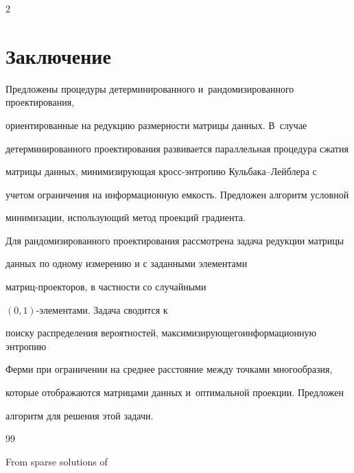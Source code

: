 \begin{multicols}{2}
\section{Заключение}





Предложены процедуры детерминированного и~рандомизированного проектирования, 


ориентированные на редукцию размерности матрицы данных. В~случае 


детерминированного проектирова\-ния развивается параллельная процедура сжатия 


матрицы данных, минимизирующая кросс-энт\-ро\-пию Куль\-ба\-ка--Лейб\-ле\-ра с 


учетом ограничения на информационную емкость.  Предложен алгоритм условной 


минимизации, использующий метод проекций градиента.





Для рандомизированного проектирования рассмотрена задача редукции матрицы 


данных по одному измерению и с заданными элементами 


мат\-риц-про\-ек\-то\-ров, в частности со случайными\linebreak


 $(0,1)$-эле\-мен\-та\-ми. Задача сводится к 


поиску распределения вероятностей, максимизирующего\linebreak информационную энтропию 


Ферми при ограничении на среднее расстояние между точками многообразия, 


которые отображаются матрицами данных и~оптимальной проекции. Предложен 


алгоритм для решения этой задачи.





{\small\frenchspacing


 {%




 \begin{thebibliography}{99}







 From sparse solutions of 



\end{thebibliography}}}
\end{multicols}
